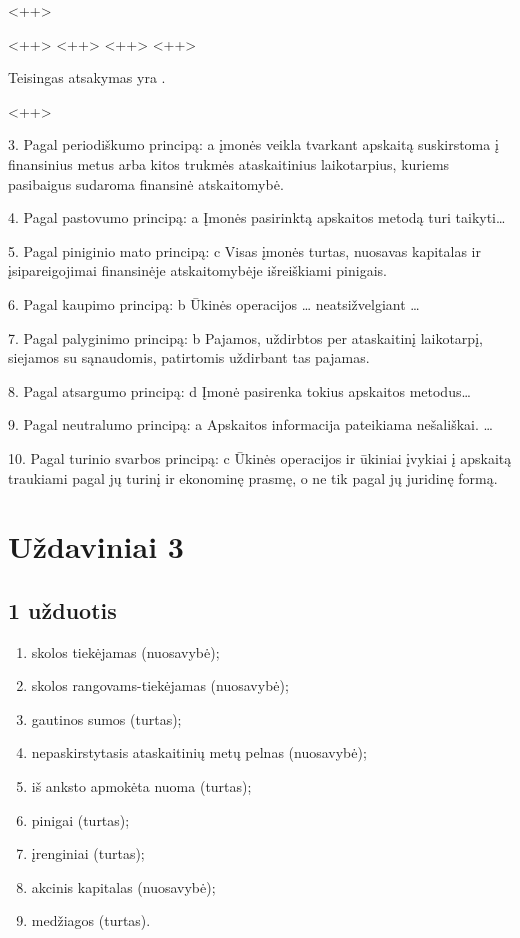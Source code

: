 \begin{tasks}
  \begin{task}
    \begin{condition}
      <++>
      \begin{enumerate}
         <++>
         <++>
         <++>
         <++>
      \end{enumerate}
    \end{condition}
    \begin{solution}
      Teisingas atsakymas yra \tref{<++>}.
    \end{solution}
  \end{task}
  
\end{tasks}<++>

3. Pagal periodiškumo principą:
a įmonės veikla tvarkant apskaitą suskirstoma į finansinius metus
arba kitos trukmės ataskaitinius laikotarpius, kuriems pasibaigus
sudaroma finansinė atskaitomybė.

4. Pagal pastovumo principą:
a Įmonės pasirinktą apskaitos metodą turi taikyti…

5. Pagal piniginio mato principą:
c Visas įmonės turtas, nuosavas kapitalas ir įsipareigojimai
finansinėje atskaitomybėje išreiškiami pinigais.

6. Pagal kaupimo principą:
b Ūkinės operacijos … neatsižvelgiant …

7. Pagal palyginimo principą:
b Pajamos, uždirbtos per ataskaitinį laikotarpį, siejamos su
sąnaudomis, patirtomis uždirbant tas pajamas.

8. Pagal atsargumo principą:
d Įmonė pasirenka tokius apskaitos metodus…

9. Pagal neutralumo principą:
a Apskaitos informacija pateikiama nešališkai. …

10. Pagal turinio svarbos principą:
c Ūkinės operacijos ir ūkiniai įvykiai į apskaitą traukiami pagal jų
turinį ir ekonominę prasmę, o ne tik pagal jų juridinę formą.

\chapter{Uždaviniai 3}

\section{1 užduotis}

\begin{enumerate}
  \item skolos tiekėjamas (nuosavybė);
  \item skolos rangovams-tiekėjamas (nuosavybė);
  \item gautinos sumos (turtas);
  \item nepaskirstytasis ataskaitinių metų pelnas (nuosavybė);
  \item iš anksto apmokėta nuoma (turtas);
  \item pinigai (turtas);
  \item įrenginiai (turtas);
  \item akcinis kapitalas (nuosavybė);
  \item medžiagos (turtas).
\end{enumerate}

